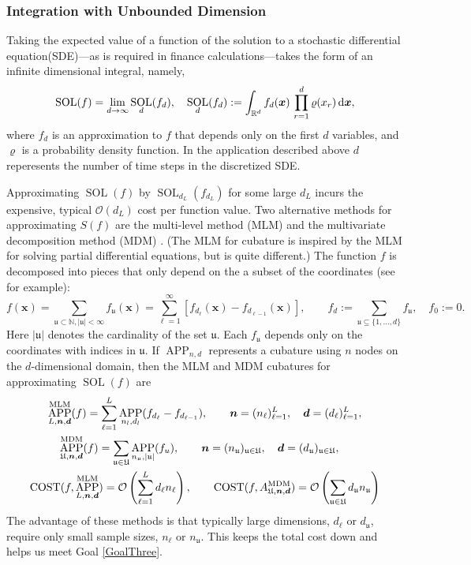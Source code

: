 \documentclass[11pt]{NSFamsart}
\DeclareMathOperator{\cost}{COST}
\newcommand{\reals}{{\mathbb{R}}}
\newcommand{\naturals}{{\mathbb{N}}}
\newcommand{\fu}{\mathfrak{u}}
\DeclareMathOperator{\SOL}{SOL}
\DeclareMathOperator{\APP}{APP}
\newcommand{\bd}{{\boldsymbol{d}}}
\newcommand{\bx}{{\boldsymbol{x}}}
\newcommand{\bn}{{\boldsymbol{n}}}
\def\dif{\textup{d}}
\newcommand{\fU}{\mathfrak{U}}
\def\abs#1{\ensuremath{\left \lvert #1 \right \rvert}}
\newcommand{\Order}{\mathcal{O}}
\begin{document}
\subsubsection{Integration with Unbounded Dimension} 

Taking the expected value of a function of the solution to a stochastic differential equation(SDE)---as is required in finance calculations---takes the form of an infinite dimensional integral, namely,
\[
\SOL(f) = \lim_{d \to \infty} \SOL_d(f_d), \quad \SOL_d(f_d):= \int_{\reals^d} f_d(\bx) \, \prod_{r=1}^{d} \varrho(x_r) \, \dif \bx, 
\]
where $f_d$ is an  approximation to $f$ that depends only on the first $d$ variables, and $\varrho$ 
is a probability density function.  In the application described above $d$ reperesents the number of time steps in the discretized SDE.

Approximating $\SOL(f)$ by $\SOL_{d_L}(f_{d_L})$ for some large $d_L$ incurs the expensive, typical $\Order(d_L)$ cost per function value.  Two alternative methods for approximating $S(f)$ are the multi-level method (MLM) \cite{Gil15a} and the  multivariate 
decomposition method (MDM) \cite{Was13b}.  (The MLM for cubature is inspired by the MLM 
for solving partial differential equations, but is quite different.) The function $f$
is decomposed into pieces that only depend on the a subset of the coordinates (see 
\cite{WanHic00b} for example):  
\begin{equation*}
f(\bx) = \sum_{\fu \subset \naturals, \abs{\fu} < \infty} f_{\fu}(\bx) = \sum_{\ell 
=1}^\infty [f_{d_\ell}(\bx) - f_{d_{\ell-1}}(\bx)], \qquad  f_d:= \sum_{\fu \subseteq \{1, 
\ldots, d\}} f_\fu, \quad f_0:= 0.
\end{equation*}
Here $\abs{\fu}$ denotes the cardinality of the set $\fu$.  Each $f_{\fu}$ depends only 
on the coordinates with indices in $\fu$.  If $\APP_{n,d}$ represents a cubature 
using $n$ nodes on the $d$-dimensional domain, then the MLM and MDM cubatures 
for approximating $\SOL(f)$ are 
\begin{gather*}
\APP^{\textup{MLM}}_{L,\bn,\bd}(f) = \sum_{\ell=1}^L \APP_{n_l,d_l}(f_{d_\ell} - f_{d_{\ell-1}}), \qquad 
\bn = (n_\ell)_{\ell = 1}^L, \quad \bd = (d_\ell)_{\ell = 1}^L, \\
\APP^{\textup{MDM}}_{\fU,\bn,\bd}(f) = \sum_{\fu \in \fU} \APP_{n_{\fu},\abs{\fu}}(f_{u}), \qquad 
\bn = (n_\fu)_{\fu \in \fU}, \quad \bd = (d_\fu)_{\fu \in \fU}, \quad  \\
\cost(f,\APP^{\textup{MLM}}_{L,\bn,\bd}) = \Order\left (\sum_{\ell=1}^L d_\ell 
n_\ell \right), \qquad \cost(f,A^{\textup{MDM}}_{\fU,\bn,\bd}) = \Order\left (\sum_{\fu \in \fU} d_\fu 
n_\fu\right)
\end{gather*}
The advantage of these methods is that typically large dimensions, $d_\ell$ or $d_{\fu}$, require only small sample sizes, $n_\ell$ or $n_\fu$.  This keeps the total cost down and helps us meet Goal \ref{GoalThree}.
\end{document}
